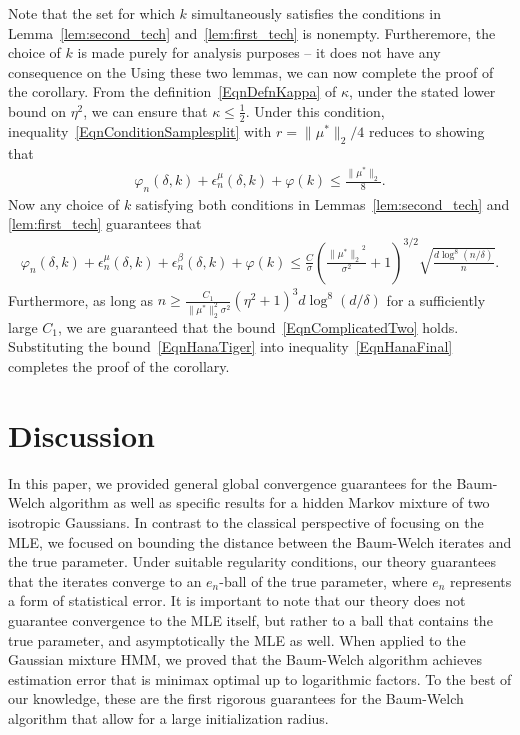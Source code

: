 \documentclass[twoside,11pt]{article}
\newcommand{\numobs}{\ensuremath{n}}
\newcommand{\usedim}{\ensuremath{d}}
\newcommand{\norm}[1]{\ensuremath{\|#1\|_2}}
\newcommand{\subsize}{\numobs} %
\newcommand{\epsilonobs}{\epsilon^\paramobs}
\newcommand{\epsilontrans}{\epsilon^\paramtrans}
\newcommand{\paramobs}{\mu}
\newcommand{\trueparamobs}{\ensuremath{\paramobs^*}}
\newcommand{\paramtrans}{\beta}
\newcommand{\SNR}{\eta^2}
\newcommand{\kdim}{\ensuremath{k}}
\newcommand{\BOUNDFUN}{\ensuremath{\varphi}}
\newcommand{\mustar}{\ensuremath{\mu^*}}
\newcommand{\BIGCON}{\ensuremath{C}}
\newcommand{\minimaxrad}{\ensuremath{e_\numobs}}
\begin{document}
Note that the set for which $\kdim$ simultaneously satisfies the conditions
in Lemma~\ref{lem:second_tech} and~\ref{lem:first_tech} is nonempty. 
Furtheremore, the choice of $\kdim$ is made purely for analysis 
purposes -- it does not have any consequence on the 
Using these two lemmas, we can now complete the proof of the
corollary.  From the definition~\eqref{EqnDefnKappa} of $\kappa$,
under the stated lower bound on $\SNR$, we can ensure that $\kappa \leq \frac{1}{2}$.
Under this condition, inequality~\eqref{EqnConditionSamplesplit} with \mbox{$r
  = \|\mustar\|_2/4$} reduces to showing that
\begin{align}
\label{EqnComplicatedTwo}
\BOUNDFUN_{\subsize}(\delta, \kdim) + \epsilonobs_{\subsize}
(\delta, \kdim) + \BOUNDFUN (\kdim) \leq 
\frac{\|\trueparamobs\|_2}{8}. %
\end{align}
Now any choice of $k$ satisfying both conditions in
Lemmas~\ref{lem:second_tech} and \ref{lem:first_tech} guarantees that
\begin{align}
\label{EqnHanaTiger}
\varphi_{\subsize} (\delta, \kdim) + \epsilonobs_{\subsize} (\delta,
\kdim) + \epsilontrans_{\subsize} (\delta, \kdim) + \BOUNDFUN(\kdim)
\leq \frac{C}{\sigma}(\frac{\norm{\trueparamobs}^2}{\sigma^2}+1)^{3/2}  \sqrt{\frac{ d
    \log^8 (\numobs/\delta)}{\numobs}}.
\end{align}
Furthermore, as long as $\numobs \geq \frac{\BIGCON_1}{\|\trueparamobs\|_2^2\sigma^2} 
(\SNR+1)^3  \usedim \log^8(  \usedim/\delta)$ for a sufficiently large
$\BIGCON_1$, we are guaranteed that the
bound~\eqref{EqnComplicatedTwo} holds. 
Substituting the bound~\eqref{EqnHanaTiger} into
inequality~\eqref{EqnHanaFinal} completes the proof of the corollary.





\section{Discussion}

In this paper, we provided general global convergence guarantees for
the Baum-Welch algorithm as well as specific results for a hidden
Markov mixture of two isotropic Gaussians.  In contrast to the
classical perspective of focusing on the MLE, we focused on bounding
the distance between the Baum-Welch iterates and the true parameter.
Under suitable regularity conditions, our theory guarantees that the
iterates converge to an $\minimaxrad$-ball of the true parameter,
where $\minimaxrad$ represents a form of statistical error.  It
is important to note that our theory does not guarantee convergence to
the MLE itself, but rather to a ball that contains the true parameter,
and asymptotically the MLE as well.  When applied to the Gaussian mixture HMM, we
proved that the Baum-Welch algorithm achieves estimation error that is minimax
optimal up to logarithmic factors.  To the best of our knowledge,
these are the first rigorous guarantees for the Baum-Welch algorithm
that allow for a large initialization radius.
\end{document}
